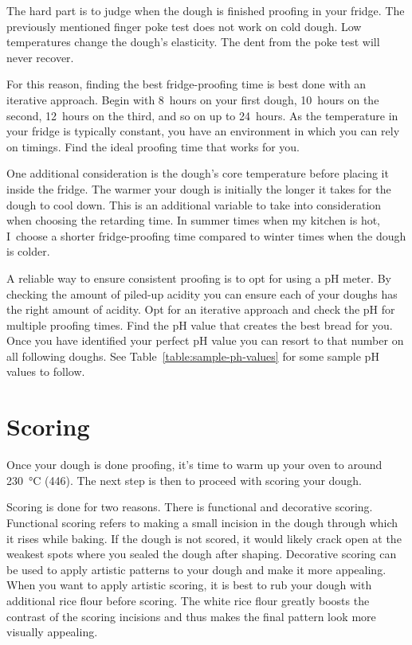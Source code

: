 The hard part is to judge when the dough is finished proofing in your fridge.
The previously mentioned finger poke test does not work on cold dough. Low
temperatures change the dough's elasticity. The dent from the poke test
will never recover.

For this reason, finding the best fridge-proofing time is best done
with an iterative approach. Begin with 8~hours on your first dough,
10~hours on the second, 12~hours on the third, and so on up to 24~hours.
As the temperature in your fridge is typically constant, you have an
environment in which you can rely on timings. Find the ideal proofing
time that works for you.

One additional consideration is the dough's core temperature before
placing it inside the fridge. The warmer your dough is initially
the longer it takes for the dough to cool down. This is an additional
variable to take into consideration when choosing the retarding time.
In summer times when my kitchen is hot, I~choose a shorter fridge-proofing
time compared to winter times when the dough is colder.

A reliable way to ensure consistent proofing is to opt for using a pH
meter. By checking the amount of piled-up acidity you can ensure
each of your doughs has the right amount of acidity. Opt for an iterative
approach and check the pH for multiple proofing times. Find the pH
value that creates the best bread for you. Once you have identified
your perfect pH value you can resort to that number on all following
doughs. See Table~\ref{table:sample-ph-values} for some sample pH values
to follow.

\section{Scoring}

Once your dough is done proofing, it's time to warm up your oven
to around \qty{230}{\degreeCelsius} (\qty{446}{\degF}). The next step is then
to proceed with scoring your dough.

Scoring is done for two reasons. There is functional and decorative
scoring. Functional scoring refers to making a small incision in the dough
through which it rises while baking. If the dough is not scored,
it would likely crack open at the weakest spots where you sealed
the dough after shaping. Decorative scoring can be used to apply
artistic patterns to your dough and make it more appealing. When
you want to apply artistic scoring, it is best to rub your dough
with additional rice flour before scoring. The white rice flour
greatly boosts the contrast of the scoring incisions and thus
makes the final pattern look more visually appealing.

